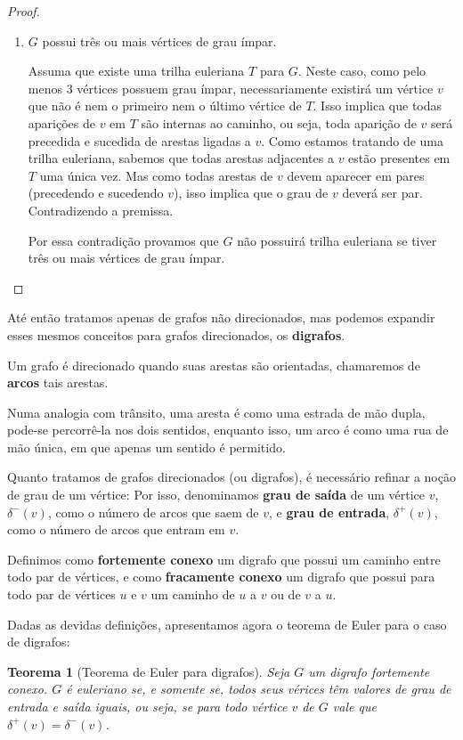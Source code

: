 \documentclass[12pt, a4paper]{article}
\newtheorem{theorem}{Teorema}[section]
\begin{document}
\begin{proof}
\begin{enumerate}
        \item $G$ possui três ou mais vértices de grau ímpar. 

			Assuma que existe uma trilha euleriana $T$ para $G$. 
			Neste caso, como pelo menos 3 vértices possuem grau ímpar, necessariamente existirá um vértice $v$ que não é nem o primeiro nem o último vértice de $T$.
			Isso implica que todas aparições de $v$ em $T$ são internas ao caminho, ou seja, toda aparição de $v$ será precedida e sucedida de arestas ligadas a $v$.
			Como estamos tratando de uma trilha euleriana, sabemos que todas arestas adjacentes a $v$ estão presentes em $T$ uma única vez. 
			Mas como todas arestas de $v$ devem aparecer em pares (precedendo e sucedendo $v$), isso implica que o grau de $v$ deverá ser par.
			Contradizendo a premissa.

			Por essa contradição provamos que $G$ não possuirá trilha euleriana se tiver três ou mais vértices de grau ímpar.
    \end{enumerate}
\end{proof}


Até então tratamos apenas de grafos não direcionados, mas podemos expandir esses mesmos conceitos para grafos direcionados, os \textbf{digrafos}.

Um grafo é direcionado quando suas arestas são orientadas, chamaremos de \textbf{arcos} tais arestas. 

Numa analogia com trânsito, uma aresta é como uma estrada de mão dupla, pode-se percorrê-la nos dois sentidos, enquanto isso, um arco é como uma rua de mão única, em que apenas um sentido é permitido.

Quanto tratamos de grafos direcionados (ou digrafos), é necessário refinar a noção de grau de um vértice:
Por isso, denominamos \textbf{grau de saída} de um vértice $v$, $\delta^-(v)$, como o número de arcos que saem de $v$, e \textbf{grau de entrada}, $\delta^+(v)$, como o número de arcos que entram em $v$. 

Definimos como \textbf{fortemente conexo} um digrafo que possui um caminho entre todo par de vértices, e como \textbf{fracamente conexo} um digrafo que possui para todo par de vértices $u$ e $v$ um caminho de $u$ a $v$ ou de $v$ a $u$.

Dadas as devidas definições, apresentamos agora o teorema de Euler para o caso de digrafos:

\begin{theorem}[Teorema de Euler para digrafos]

    Seja $G$ um digrafo fortemente conexo.
$G$ é euleriano se, e somente se, todos seus vérices têm valores de grau de entrada e saída iguais, ou seja, se para todo vértice $v$ de $G$ vale que $\delta^+(v) = \delta^-(v)$.
\label{euler-digraph}
\end{theorem}
\end{document}
